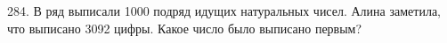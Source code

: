 284. В ряд выписали 1000 подряд идущих натуральных чисел. Алина заметила, что выписано 3092 цифры. Какое число было выписано первым?\\
